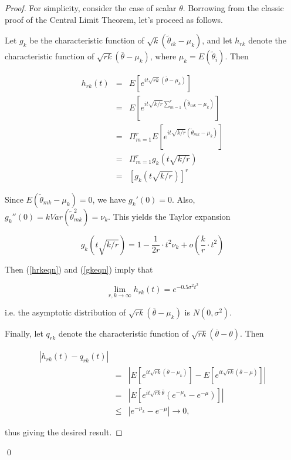 \begin{proof}

For simplicity, consider the case of scalar $\theta$.  Borrowing from
the classic proof of the Central Limit Theorem, let's proceed as
follows.  

Let $g_k$ be the characteristic function of $\sqrt{k}
(\tilde{\theta}_{ik} - \mu_k)$, and let $h_{rk}$ denote the
characteristic function of $\sqrt{rk} (\overline{\theta}- \mu_k)$, where
$\mu_k = E(\tilde{\theta}_i)$.  Then

\begin{eqnarray}
h_{rk}(t) &=&
E \left [
e^{it \sqrt{rk} (\overline{\theta} - \mu_k)}
\right ] \\ 
&=& 
E \left [
e^{it \sqrt{k/r} \sum_{m=1}^r (\tilde{\theta}_{mk} - \mu_k)}
\right ] \\ 
&=& 
\Pi_{m=1}^r
E \left [
e^{it \sqrt{k/r} (\tilde{\theta}_{mk} - \mu_k)}
\right ] \\ 
&=& 
\Pi_{m=1}^r
g_k(t \sqrt{k/r}) \\
&=& 
\left [
g_k(t \sqrt{k/r})
\right ]^r
\label{hrkeqn}
\end{eqnarray}

Since $E(\tilde{\theta}_{mk} - \mu_k) = 0$, we have $g_k'(0) = 0$.
Also, $g_k''(0) = k Var(\tilde{\theta}_{mk}^2) = \nu_k$.  This yields the
Taylor expansion

\begin{equation}
\label{gkeqn}
g_k(t \sqrt{k/r})
=
1 - \frac{1}{2r} \cdot t^2 \nu_k + o( \frac{k}{r} \cdot t^2)
\end{equation}

Then (\ref{hrkeqn}) and (\ref{gkeqn}) imply that

\begin{equation}
\lim_{r,k \rightarrow \infty} h_{rk}(t) = e^{-0.5 \sigma^2 t^2}
\end{equation}

\noindent
i.e. the asymptotic distribution of $\sqrt{rk} (\overline{\theta}-
\mu_k)$ is $N(0,\sigma^2)$.

Finally, let $q_{rk}$ denote the characteristic function of 
$\sqrt{rk} (\overline{\theta} - \theta)$.  Then

\begin{eqnarray}
|h_{rk}(t) - q_{rk}(t)| \\
&=&
| E \left [
e^{it \sqrt{rk} (\overline{\theta} - \mu_k)}
\right ] -
E \left [
e^{it \sqrt{rk} (\overline{\theta} - \mu)}
\right ]| \\
&=&
| E \left [
e^{it \sqrt{rk} \overline{\theta}} (e^{-\mu_k} - e^{-\mu})
\right ]| \\
&\leq& |e^{-\mu_k} - e^{-\mu}| \rightarrow 0,
\end{eqnarray}

\noindent
thus giving the desired result.

\end{proof}
\qed

